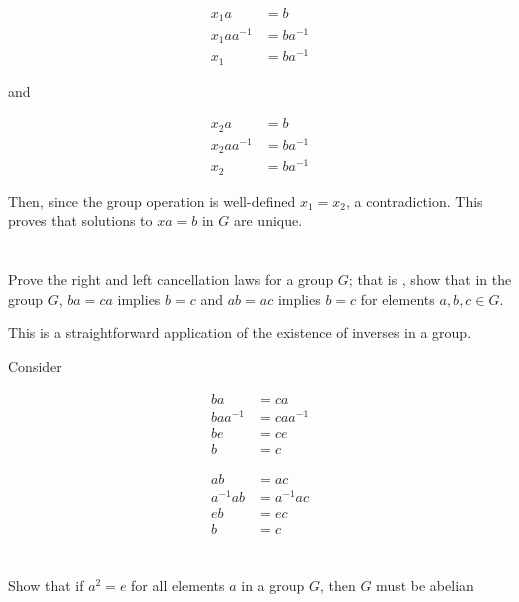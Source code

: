 \documentclass[a4paper]{article}
\begin{document}
\begin{align*}
x_1 a &= b \\
x_1 a a^{-1} &= b a^{-1} \\
x_1 &= b a^{-1}
\end{align*}

and 

\begin{align*}
x_2 a &= b \\
x_2 a a^{-1} &= b a^{-1} \\
x_2 &= b a^{-1}
\end{align*}

Then, since the group operation is well-defined $x_1 = x_2$, a contradiction. This proves that solutions to $xa = b$ in $G$ are unique.


\section{}


\section{}

Prove the right and left cancellation laws for a group $G$; that is , show that in the group $G$, $ba = ca$ implies $b = c$ and $ab = ac$ implies $b = c$ for elements $a,b,c \in G$.

\vspace{\baselineskip}

This is a straightforward application of the existence of inverses in a  group.

Consider

\begin{align*}
ba &= ca \\
baa^{-1} &= caa^{-1} \\
be &= ce \\ 
b &= c
\end{align*}

\begin{align*}
ab &= ac \\
a^{-1}ab &= a^{-1}ac \\
eb &= ec \\
b &= c
\end{align*}


\section{}

Show that if $a^2 = e$ for all elements $a$ in a group $G$, then $G$ must be abelian
\end{document}
